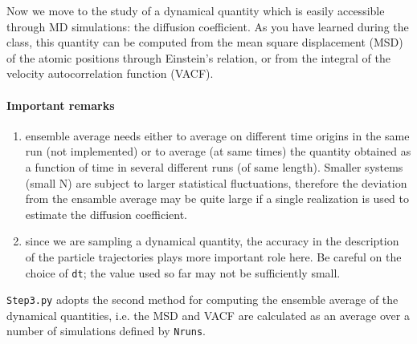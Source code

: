 \documentclass[12pt]{article}
\begin{document}
Now we move to the study of a dynamical quantity which is easily accessible
through MD simulations: the diffusion coefficient. As you have learned during
the class, this quantity can be computed from the mean square displacement
(MSD) of the atomic positions through Einstein's relation, or from the integral
of the velocity autocorrelation function (VACF).


\paragraph{Important remarks}
\begin{enumerate}
\item ensemble average needs either to average on different time origins in the
same run (not implemented) or to average (at same times) the quantity obtained
as a function of time in several different runs (of same length).
Smaller systems (small N) are subject to larger statistical fluctuations, 
therefore the deviation from the ensamble average may be quite large if a
single realization is used to estimate the diffusion coefficient.

\item since we are sampling a dynamical quantity, the accuracy in the description
of the particle trajectories plays more important role here. Be careful on the
choice of \verb!dt!; the value used so far may not be sufficiently small.
\end{enumerate}

\verb!Step3.py! adopts the second method for computing the ensemble average of the
dynamical quantities, i.e. the MSD and VACF are calculated as an average over a number
of simulations defined by \verb!Nruns!. 
\end{document}
